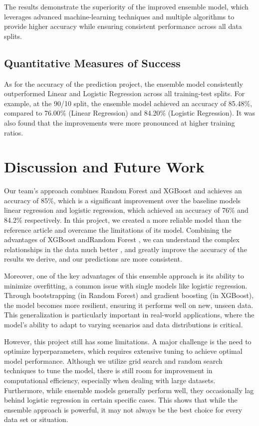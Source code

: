 \documentclass[conference]{IEEEtran}
\begin{document}
The results demonstrate the superiority of the improved ensemble model, which leverages advanced machine-learning techniques and multiple algorithms to provide higher accuracy while ensuring consistent performance across all data splits.

\subsection{Quantitative Measures of Success}

As for the accuracy of the prediction project,  the ensemble model consistently outperformed Linear and Logistic Regression across all training-test splits. For example, at the 90/10 split, the ensemble model achieved an accuracy of 85.48\%, compared to 76.00\% (Linear Regression) and 84.20\% (Logistic Regression). It was also found that the improvements were more pronounced at higher training ratios.



\section{Discussion and Future Work}
Our team’s approach combines Random Forest and XGBoost and achieves an accuracy of 85\%, which is a significant improvement over the baseline models linear regression and logistic regression, which achieved an accuracy of 76\% and 84.2\% respectively. In this project, we created a more reliable model than the reference article and overcame the limitations of its model. Combining the advantages of XGBoost andRandom Forest , we can understand the complex relationships in the data much better , and greatly improve the accuracy of the results we derive, and our predictions are more consistent.

Moreover, one of the key advantages of this ensemble approach is its ability to minimize overfitting, a common issue with single models like logistic regression. Through bootstrapping (in Random Forest) and gradient boosting (in XGBoost), the model becomes more resilient, ensuring it performs well on new, unseen data. This generalization is particularly important in real-world applications, where the model's ability to adapt to varying scenarios and data distributions is critical.

However, this project still has some limitations. A major challenge is the need to optimize hyperparameters, which requires extensive tuning to achieve optimal model performance. Although we utilize grid search and random search techniques to tune the model, there is still room for improvement in computational efficiency, especially when dealing with large datasets. Furthermore, while ensemble models generally perform well, they occasionally lag behind logistic regression in certain specific cases. This shows that while the ensemble approach is powerful, it may not always be the best choice for every data set or situation. 
\end{document}
